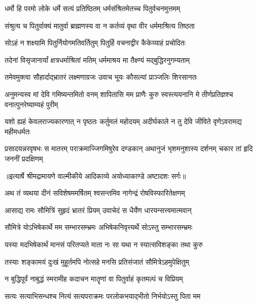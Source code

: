 \twolineshloka
{धर्मो हि परमो लोके धर्मे सत्यं प्रतिष्ठितम्}
{धर्मसंश्रितमेतच्च पितुर्वचनमुत्तमम्} %

\twolineshloka
{संश्रुत्य च पितुर्वाक्यं मातुर्वा ब्राह्मणस्य वा}
{न कर्तव्यं वृथा वीर धर्ममाश्रित्य तिष्ठता} %

\twolineshloka
{सोऽहं न शक्ष्यामि पितुर्नियोगमतिवर्तितुम्}
{पितुर्हि वचनाद्वीर कैकेय्याहं प्रचोदितः} %

\twolineshloka
{तदेनां विसृजानार्यां क्षत्रधर्माश्रितां मतिम्}
{धर्ममाश्रय मा तैक्ष्ण्यं मद्बुद्धिरनुगम्यताम्} %

\twolineshloka
{तमेवमुक्त्वा सौहार्दाद्भ्रातरं लक्ष्मणाग्रजः}
{उवाच भूयः कौसल्यां प्राञ्जलिः शिरसानतः} %

\threelineshloka
{अनुमन्यस्व मां देवि गमिष्यन्तमितो वनम्}
{शापितासि मम प्राणैः कुरु स्वस्त्ययनानि मे}
{तीर्णप्रतिज्ञश्च वनात्पुनरेष्याम्यहं पुरीम्} %

\fourlineindentedshloka
{यशो ह्यहं केवलराज्यकारणात्}
{न पृष्ठतः कर्तुमलं महोदयम्}
{अदीर्घकाले न तु देवि जीविते}
{वृणेऽवरामद्य महीमधर्मतः} %

\fourlineindentedshloka
{प्रसादयन्नरवृषभः स मातरम्}
{पराक्रमाज्जिगमिषुरेव दण्डकान्}
{अथानुजं भृशमनुशास्य दर्शनम्}
{चकार तां हृदि जननीं प्रदक्षिणम्} %


{॥इत्यार्षे श्रीमद्रामायणे वाल्मीकीये आदिकाव्ये अयोध्याकाण्डे अष्टादशः सर्गः॥}


\twolineshloka
{अथ तं व्यथया दीनं सविशेषममर्षितम्}
{श्वसन्तमिव नागेन्द्रं रोषविस्फारितेक्षणम्} %

\twolineshloka
{आसाद्य रामः सौमित्रिं सुहृदं भ्रातरं प्रियम्}
{उवाचेदं स धैर्येण धारयन्सत्त्वमात्मवान्} %

\twolineshloka
{सौमित्रे योऽभिषेकार्थे मम सम्भारसम्भ्रमः}
{अभिषेकनिवृत्त्यर्थे सोऽस्तु सम्भारसम्भ्रमः} %

\twolineshloka
{यस्या मदभिषेकार्थं मानसं परितप्यते}
{माता नः सा यथा न स्यात्सविशङ्का तथा कुरु} %

\twolineshloka
{तस्याः शङ्कामयं दुःखं मुहूर्तमपि नोत्सहे}
{मनसि प्रतिसंजातं सौमित्रेऽहमुपेक्षितुम्} %

\twolineshloka
{न बुद्धिपूर्वं नाबुद्धं स्मरामीह कदाचन}
{मातॄणां वा पितुर्वाहं कृतमल्पं च विप्रियम्} %

\twolineshloka
{सत्यः सत्याभिसन्धश्च नित्यं सत्यपराक्रमः}
{परलोकभयाद्भीतो निर्भयोऽस्तु पिता मम} %

